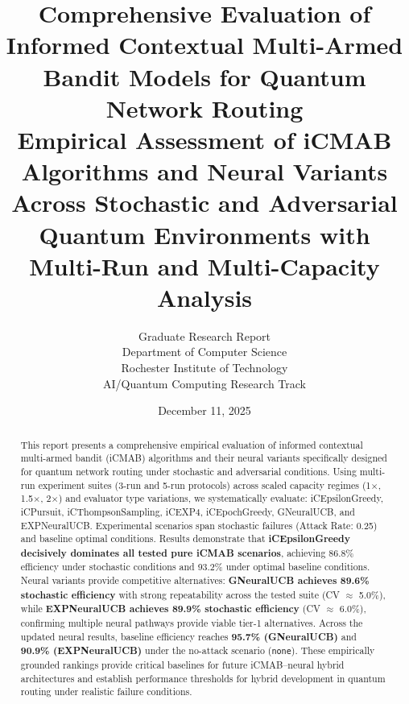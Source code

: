 \documentclass[12pt,a4paper]{article}
\title{\textbf{Comprehensive Evaluation of Informed Contextual Multi-Armed Bandit Models for Quantum Network Routing}\\
\large{Empirical Assessment of iCMAB Algorithms and Neural Variants Across Stochastic and Adversarial Quantum Environments with Multi-Run and Multi-Capacity Analysis}}
\author{Graduate Research Report\\
Department of Computer Science\\
Rochester Institute of Technology\\
AI/Quantum Computing Research Track}
\date{December 11, 2025}
\newcommand{\primarytext}[1]{\textcolor{primaryblue}{\textbf{#1}}}
\newcommand{\legacy}[1]{\textcolor{legacycolor}{\textbf{#1}}}
\newcommand{\neural}[1]{\textcolor{neuralcolor}{\textbf{#1}}}
\begin{document}
\maketitle

\begin{abstract}
This report presents a comprehensive empirical evaluation of informed contextual multi-armed bandit (iCMAB) algorithms and their neural variants specifically designed for quantum network routing under stochastic and adversarial conditions. Using multi-run experiment suites (3-run and 5-run protocols) across scaled capacity regimes (1$\times$, 1.5$\times$, 2$\times$) and evaluator type variations, we systematically evaluate: iCEpsilonGreedy, iCPursuit, iCThompsonSampling, iCEXP4, iCEpochGreedy, GNeuralUCB, and EXPNeuralUCB. Experimental scenarios span stochastic failures (Attack Rate: 0.25) and baseline optimal conditions. Results demonstrate that \primarytext{iCEpsilonGreedy decisively dominates all tested pure iCMAB scenarios}, achieving 86.8\% efficiency under stochastic conditions and 93.2\% under optimal baseline conditions. Neural variants provide competitive alternatives: \neural{GNeuralUCB achieves 89.6\% stochastic efficiency} with strong repeatability across the tested suite (CV $\approx$ 5.0\%), while \legacy{EXPNeuralUCB achieves 89.9\% stochastic efficiency} (CV $\approx$ 6.0\%), confirming multiple neural pathways provide viable tier-1 alternatives. Across the updated neural results, baseline efficiency reaches \neural{95.7\% (GNeuralUCB)} and \legacy{90.9\% (EXPNeuralUCB)} under the no-attack scenario (\texttt{none}). These empirically grounded rankings provide critical baselines for future iCMAB--neural hybrid architectures and establish performance thresholds for hybrid development in quantum routing under realistic failure conditions.
\end{abstract}

\newpage
\tableofcontents

\newpage
\end{document}
